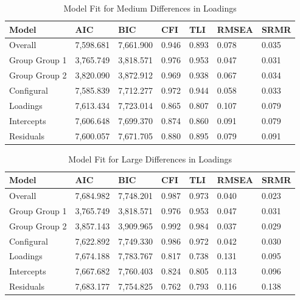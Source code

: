 \documentclass[
  man]{apa7}
\begin{document}
\begin{table}[tbp]

\begin{center}
\begin{threeparttable}

\caption{\label{tab:tab3}Model Fit for Medium Differences in Loadings}

\begin{tabular}{lllllll}
\toprule
Model & AIC & BIC & CFI & TLI & RMSEA & SRMR\\
\midrule
Overall & 7,598.681 & 7,661.900 & 0.946 & 0.893 & 0.078 & 0.035\\
Group Group 1 & 3,765.749 & 3,818.571 & 0.976 & 0.953 & 0.047 & 0.031\\
Group Group 2 & 3,820.090 & 3,872.912 & 0.969 & 0.938 & 0.067 & 0.034\\
Configural & 7,585.839 & 7,712.277 & 0.972 & 0.944 & 0.058 & 0.033\\
Loadings & 7,613.434 & 7,723.014 & 0.865 & 0.807 & 0.107 & 0.079\\
Intercepts & 7,606.648 & 7,699.370 & 0.874 & 0.860 & 0.091 & 0.079\\
Residuals & 7,600.057 & 7,671.705 & 0.880 & 0.895 & 0.079 & 0.091\\
\bottomrule
\end{tabular}

\end{threeparttable}
\end{center}

\end{table}

\begin{table}[tbp]

\begin{center}
\begin{threeparttable}

\caption{\label{tab:tab4}Model Fit for Large Differences in Loadings}

\begin{tabular}{lllllll}
\toprule
Model & AIC & BIC & CFI & TLI & RMSEA & SRMR\\
\midrule
Overall & 7,684.982 & 7,748.201 & 0.987 & 0.973 & 0.040 & 0.023\\
Group Group 1 & 3,765.749 & 3,818.571 & 0.976 & 0.953 & 0.047 & 0.031\\
Group Group 2 & 3,857.143 & 3,909.965 & 0.992 & 0.984 & 0.037 & 0.029\\
Configural & 7,622.892 & 7,749.330 & 0.986 & 0.972 & 0.042 & 0.030\\
Loadings & 7,674.188 & 7,783.767 & 0.817 & 0.738 & 0.131 & 0.095\\
Intercepts & 7,667.682 & 7,760.403 & 0.824 & 0.805 & 0.113 & 0.096\\
Residuals & 7,683.177 & 7,754.825 & 0.762 & 0.793 & 0.116 & 0.138\\
\bottomrule
\end{tabular}

\end{threeparttable}
\end{center}

\end{table}
\end{document}

